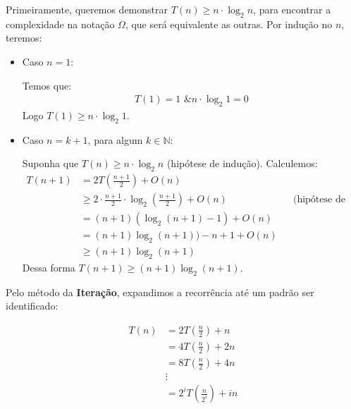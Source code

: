 Primeiramente, queremos demonstrar $T(n) \geq n \cdot \log_2 n$, para encontrar a complexidade na notação $\Omega$, que será equivalente as outras. Por indução no $n$, teremos:


\begin{itemize}
	\item Caso $n = 1$:
	      \begin{adjustwidth}{1em}{}
		      Temos que:
		      \begin{align*}
			      T(1) = 1 \text{ \& } n \cdot \log_2 1 = 0
		      \end{align*}
		      Logo $T(1) \geq n \cdot \log_2 1$.
	      \end{adjustwidth}
	\item Caso $n = k + 1$, para algum $k \in \mathbb{N}$:
	      \begin{adjustwidth}{1em}{}
		      Suponha que $T(n) \geq n \cdot \log_2 n$ (hipótese de indução). Calculemos:
		      \begin{align*}
			      T(n + 1) & = 2T\left(\frac{n + 1}{2}\right) + O(n)                                                                                            \\
			               & \geq 2 \cdot \frac{n + 1}{2} \cdot \log_2 \left(\frac{n + 1}{2}\right) + O(n) &  & \text{(hipótese de indução e função crescente)} \\
			               & = (n + 1)(\log_2 (n + 1) - 1) + O(n)                                                                                               \\
			               & = (n + 1)\log_2 (n + 1)) - n + 1 + O(n)                                                                                            \\
			               & \geq (n + 1)\log_2 (n + 1)
		      \end{align*}
		      Dessa forma $T(n + 1) \geq (n + 1)\log_2 (n + 1)$.
	      \end{adjustwidth}
\end{itemize}


Pelo método da \textbf{Iteração}, expandimos a recorrência até um padrão ser identificado:

\begin{align*}
	T(n) & =  2T\left(\frac{n}{2}\right) + n     \\
	     & = 4T\left(\frac{n}{2}\right) + 2n     \\
	     & = 8T\left(\frac{n}{2}\right) + 4n     \\
	     & \vdots                                \\
	     & = 2^iT\left(\frac{n}{2^i}\right) + in \\
\end{align*}

